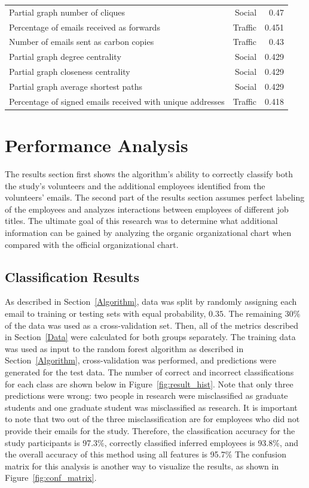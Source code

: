 \documentclass[12pt]{report}
\begin{document}
\begin{table}[t]
{\begin{tabular}{@{}lrr@{}}
Partial graph number of cliques              & Social       & 0.47 \\
Percentage of emails received as forwards    & Traffic      & 0.451 \\
Number of emails sent as carbon copies       & Traffic      & 0.43 \\
Partial graph degree centrality              & Social       & 0.429 \\
Partial graph closeness centrality           & Social       & 0.429 \\
Partial graph average shortest paths         & Social       & 0.429 \\ 
Percentage of signed emails received with unique addresses & Traffic & 0.418\\ \bottomrule

\end{tabular}
}
\end{table}


\chapter{Performance Analysis} \label{Performance}
The results section first shows the algorithm's ability to correctly classify both the study's volunteers and the additional employees identified from the volunteers' emails.
The second part of the results section assumes perfect labeling of the employees and analyzes interactions between employees of different job titles.
The ultimate goal of this research was to determine what additional information can be gained by analyzing the organic organizational chart when compared with the official organizational chart.

\section{Classification Results}
As described in Section~\ref{Algorithm}, data was split by randomly assigning each email to training or testing sets with equal probability, $0.35$.
The remaining 30\% of the data was used as a cross-validation set.
Then, all of the metrics described in Section~\ref{Data} were calculated for both groups separately.
The training data was used as input to the random forest algorithm as described in Section~\ref{Algorithm}, cross-validation was performed, and predictions were generated for the test data.
The number of correct and incorrect classifications for each class are shown below in Figure~\ref{fig:result_hist}.
Note that only three predictions were wrong: two people in research were misclassified as graduate students and one graduate student was misclassified as research.
It is important to note that two out of the three misclassification are for employees who did not provide their emails for the study.
Therefore, the classification accuracy for the study participants is 97.3\%, correctly classified inferred employees is 93.8\%, and the overall accuracy of this method using all features is 95.7\%
The confusion matrix for this analysis is another way to visualize the results, as shown in Figure~\ref{fig:conf_matrix}.
\end{document}
